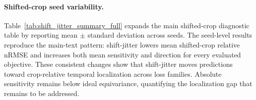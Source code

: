 \documentclass[12pt]{article}
\begin{document}
\FloatBarrier

\paragraph{Shifted-crop seed variability.}
Table~\ref{tab:shift_jitter_summary_full} expands the main shifted-crop diagnostic table by reporting mean $\pm$ standard deviation across seeds. The seed-level results reproduce the main-text pattern: shift-jitter lowers mean shifted-crop relative nRMSE and increases both mean sensitivity and direction for every evaluated objective. These consistent changes show that shift-jitter moves predictions toward crop-relative temporal localization across loss families. Absolute sensitivity remains below ideal equivariance, quantifying the localization gap that remains to be addressed.
\end{document}
